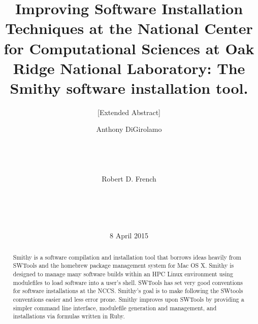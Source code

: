 \documentclass{acm_proc_article-sp}
\begin{document}
\title{Improving Software Installation Techniques at the National Center for Computational Sciences at Oak Ridge National Laboratory: The Smithy software installation tool.}

\subtitle{[Extended Abstract]
}

%
\author{
\alignauthor
Anthony DiGirolamo\\
       \\
       \\
       \\
       \\
\alignauthor
Robert D. French\\
       \\
       \\
       \\
       \\
}

\date{8 April 2015}

\maketitle

\begin{abstract}
Smithy is a software compilation and installation tool that borrows ideas
heavily from SWTools\cite{swtools} and the homebrew\cite{homebrew} package
management system for Mac OS X.  Smithy is designed to manage many software
builds within an HPC Linux environment using modulefiles to load software into a
user's shell.  SWTools has set very good conventions for software installations
at the NCCS.  Smithy's goal is to make following the SWtools conventions easier
and less error prone.  Smithy improves upon SWTools by providing a simpler
command line interface, modulefile generation and management, and installations
via formulas written in Ruby.
\end{abstract}
\end{document}
